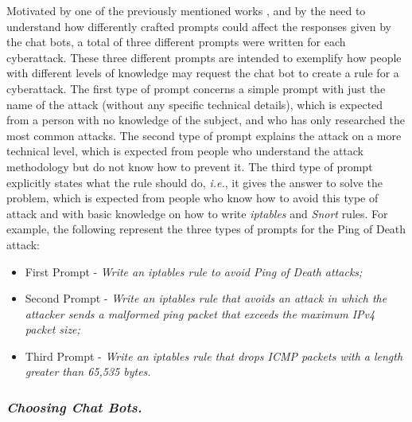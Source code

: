\documentclass[sigconf]{acmart}
\begin{document}
Motivated by one of the previously mentioned works \cite{Temara23},  and by the need to understand
how differently crafted prompts could affect the responses given
by the chat bots, a total of three different prompts were written
for each cyberattack. These three different prompts are intended
to exemplify how people with different levels of knowledge may
request the chat bot to create a rule for a cyberattack.
The first type of prompt concerns a simple prompt with just the
name of the attack (without any specific technical details), which is
expected from a person with no knowledge of the subject, and who
has only researched the most common attacks. The second type
of prompt explains the attack on a more technical level, which is
expected from people who understand the attack methodology but
do not know how to prevent it. The third type of prompt explicitly
states what the rule should do, {\itshape i.e.}, it gives the answer to solve
the problem, which is expected from people who know how to
avoid this type of attack and with basic knowledge on how to write
{\itshape iptables} and {\itshape Snort} rules. For example, the following represent the
three types of prompts for the Ping of Death attack:
\begin{itemize}
  \item First Prompt - {\itshape Write an iptables rule to avoid Ping of Death
attacks;}
\item Second Prompt - {\itshape Write an iptables rule that avoids an attack in
which the attacker sends a malformed ping packet that exceeds
the maximum IPv4 packet size;}
\item Third Prompt - {\itshape Write an iptables rule that drops ICMP packets
with a length greater than 65,535 bytes.}
\end{itemize}

\subsubsection{{\itshape Choosing Chat Bots.}}
\end{document}
